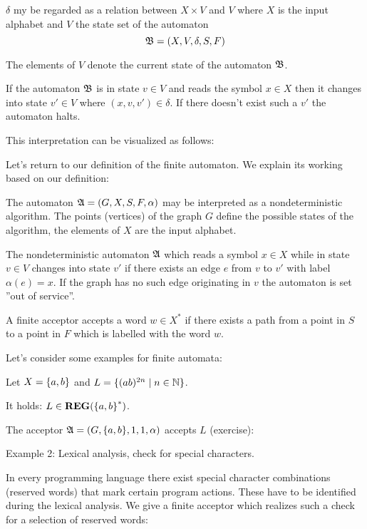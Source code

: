 $\delta$ my be regarded as a relation between $X \times V$ and $V$ where $X$ is
the input alphabet and $V$ the state set of the automaton \[ \mbox{$\mathfrak{B}$} = (X,
V, \delta, S, F) \]

The elements of $V$ denote the current state of the automaton $\mbox{$\mathfrak{B}$}$.

If the automaton $\mbox{$\mathfrak{B}$}$ is in state $v \in V$ and reads the symbol $x
\in X$ then it changes into state $v' \in V$ where $(x, v, v') \in \delta$. If
there doesn't exist such a $v'$ the automaton halts.

This interpretation can be visualized as follows:

\missingfigure

Let's return to our definition of the finite automaton. We explain its
working based on our definition:

The automaton $\mbox{$\mathfrak{A}$} = (G, X, S, F, \alpha)$ may be interpreted as a
nondeterministic algorithm. The points (vertices) of the graph $G$ define the
possible states of the algorithm, the elements of $X$ are the input alphabet.

The nondeterministic automaton $\mbox{$\mathfrak{A}$}$ which reads a symbol $x \in X$
while in state $v \in V$ changes into state $v'$ if there exists an edge $e$
from $v$ to $v'$ with label $\alpha(e) = x$. If the graph has no such edge
originating in $v$ the automaton is set ''out of service''.

A finite acceptor accepts a word $w \in X^*$ if there exists a path from a point
in $S$ to a point in $F$ which is labelled with the word $w$.

Let's consider some examples for finite automata:

\begin{example}
Let $X = \mbox{$\{a, b\}$}$ and $L = \mbox{$\{(a b)^{2n} \mid n \in
\mathbb{N}\}$}$.

It holds: $L \in \mbox{{\bf REG}}(\mbox{$\{a, b\}$}^*)$.

The acceptor $\mbox{$\mathfrak{A}$} = (G, \mbox{$\{a, b\}$}, {1}, {1}, \alpha)$ accepts $L$
(exercise):
\begin{center}

\end{center}
\end{example}

\bigskip
Example 2: Lexical analysis, check for special characters.

In every programming language there exist special character combinations
(reserved words) that mark certain program actions. These have to be identified
during the lexical analysis. We give a finite acceptor which realizes such a check for a selection
of reserved words:

